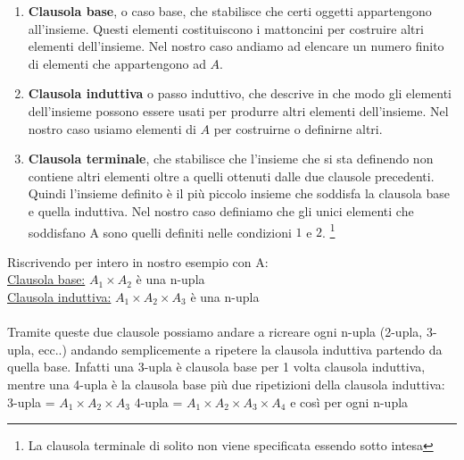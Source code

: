 \begin{enumerate}
    \item \textbf{Clausola base}, o caso base, che stabilisce che certi oggetti appartengono all'insieme. Questi elementi costituiscono i mattoncini per costruire altri elementi dell’insieme. Nel nostro caso andiamo ad elencare un numero finito di elementi che appartengono ad $A$.
    \item \textbf{Clausola induttiva} o passo induttivo, che descrive in che modo gli elementi dell'insieme possono essere usati per produrre altri elementi dell'insieme. Nel nostro caso usiamo elementi di $A$ per costruirne o definirne altri.
    \item \textbf{Clausola terminale}, che stabilisce che l'insieme che si sta definendo non contiene altri elementi oltre a quelli ottenuti dalle due clausole precedenti. Quindi l'insieme definito è il più piccolo insieme che soddisfa la clausola base e quella induttiva. Nel nostro caso definiamo che gli unici elementi che soddisfano A sono quelli definiti nelle condizioni $1$ e $2$. \footnote{La clausola terminale di solito non viene specificata essendo sotto intesa}
\end{enumerate}
\begin{example}
    Riscrivendo per intero in nostro esempio con A:\\
    \underline{Clausola base:} $A_1 \times A_2$ è una n-upla\\
    \underline{Clausola induttiva:} $A_1 \times A_2 \times A_3$ è una n-upla\\ \\
    Tramite queste due clausole possiamo andare a ricreare ogni n-upla (2-upla, 3-upla, ecc..) andando semplicemente a ripetere la clausola induttiva partendo da quella base. Infatti una 3-upla è clausola base per 1 volta clausola induttiva, mentre una 4-upla è la clausola base più due ripetizioni della clausola induttiva: \\
    3-upla = $A_1 \times A_2 \times A_3$ \hspace{.5cm} 4-upla = $A_1 \times A_2 \times A_3 \times A_4$ \hspace{.5cm} e così per ogni n-upla
\end{example}
